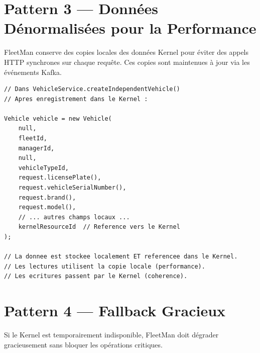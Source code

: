 \documentclass[12pt,a4paper]{report}
\begin{document}
\section{Pattern 3 — Données Dénormalisées pour la Performance}

FleetMan conserve des copies locales des données Kernel pour éviter
des appels HTTP synchrones sur chaque requête. Ces copies sont
maintenues à jour via les événements Kafka.

\begin{lstlisting}[style=javaStyle, caption={Strategie de denormalisation}]
// Dans VehicleService.createIndependentVehicle()
// Apres enregistrement dans le Kernel :

Vehicle vehicle = new Vehicle(
    null,
    fleetId,
    managerId,
    null,
    vehicleTypeId,
    request.licensePlate(),
    request.vehicleSerialNumber(),
    request.brand(),
    request.model(),
    // ... autres champs locaux ...
    kernelResourceId  // Reference vers le Kernel
);

// La donnee est stockee localement ET referencee dans le Kernel.
// Les lectures utilisent la copie locale (performance).
// Les ecritures passent par le Kernel (coherence).
\end{lstlisting}

\section{Pattern 4 — Fallback Gracieux}

Si le Kernel est temporairement indisponible, FleetMan doit dégrader
gracieusement sans bloquer les opérations critiques.
\end{document}
